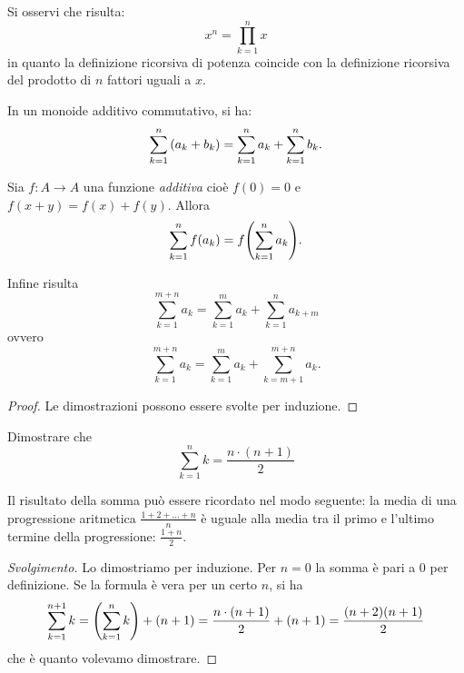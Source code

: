 Si osservi che risulta:
\[
  x^n = \prod_{k=1}^n x
\]
in quanto la definizione ricorsiva di potenza coincide 
con la definizione ricorsiva del 
prodotto di $n$ fattori uguali a $x$.

\begin{theorem}
In un monoide additivo commutativo, si ha:
  \[
  \sum_{k=1}^n  {\left( a_k + b_k \right)} 
  = \sum_{k=1}^n a_k + \sum_{k=1}^n b_k.
  \]

Sia $f\colon A\to A$ una funzione \emph{additiva}
cioè $f(0) = 0$ e $f(x+y)=f(x)+f(y)$.
Allora 
  \[
    \sum_{k=1}^n  f(a_k) = f{\left( \sum_{k=1}^n a_k \right)}.
  \]

Infine risulta 
  \[
  \sum_{k=1}^{m+n} a_k = \sum_{k=1}^m a_k + \sum_{k=1}^n a_{k+m}
  \]
ovvero 
  \[
  \sum_{k=1}^{m+n} a_k = \sum_{k=1}^m a_k + \sum_{k=m+1}^{m+n} a_k.  
  \]
\end{theorem}
\begin{proof}
  Le dimostrazioni possono essere svolte 
  per induzione.
\end{proof}

\begin{exercise}
  \label{ex:somma_lineare}%
  Dimostrare che 
  \[
    \sum_{k=1}^n k = \frac{n\cdot (n+1)}{2}
  \]
\end{exercise}
Il risultato della somma può essere ricordato nel modo seguente:
la media di una progressione aritmetica $\frac{1+2+ \dots + n}{n}$ 
è uguale alla media tra il primo 
e l'ultimo termine della progressione: $\frac{1+n}{2}$.
\begin{proof}[Svolgimento]
Lo dimostriamo per induzione.
Per $n=0$ la somma è pari a $0$ per definizione.
Se la formula è vera per un certo $n$, si ha 
\[
  \sum_{k=1}^{n+1} k = {\left( \sum_{k=1}^n k \right)} + (n+1)
   = \frac{n\cdot(n+1)}{2} + (n+1) 
   = \frac{(n+2)(n+1)}{2}
\]
che è quanto volevamo dimostrare.
\end{proof}

